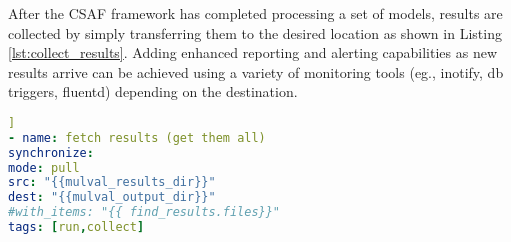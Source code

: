 After the CSAF framework has completed processing a set of models, results are collected by simply transferring them to the desired location as shown in Listing \ref{lst:collect_results}. Adding enhanced reporting and alerting capabilities as new results arrive can be achieved using a variety of monitoring tools (eg., inotify, db triggers, fluentd) depending on the destination.

\begin{minipage}{.95\linewidth}
\begin{lstlisting}[language=yaml, label={lst:collect_results}, caption={Collect Results},captionpos=b, ]]
- name: fetch results (get them all)
synchronize:
mode: pull
src: "{{mulval_results_dir}}"
dest: "{{mulval_output_dir}}"
#with_items: "{{ find_results.files}}"
tags: [run,collect]
\end{lstlisting}
\end{minipage}
